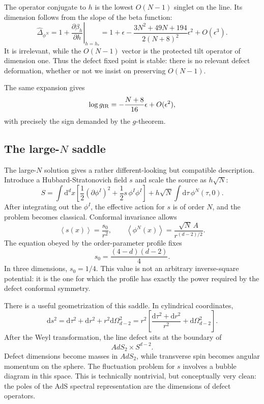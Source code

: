 \documentclass[11pt]{article}
\newcommand{\dd}{\mathrm{d}}
\newcommand{\vev}[1]{\left\langle #1\right\rangle}
\begin{document}
The operator conjugate to $h$ is the lowest $O(N-1)$ singlet on the line.  Its
dimension follows from the slope of the beta function:
\begin{equation}
  \widehat\Delta_{\phi^N}
  =1+\left.\frac{\partial\beta_h}{\partial h}\right|_{h=h_*}
  =1+\epsilon
  -\frac{3N^2+49N+194}{2(N+8)^2}\epsilon^2
  +O(\epsilon^3) .
  \label{eq:pinningSingletDimension}
\end{equation}
It is irrelevant, while the $O(N-1)$ vector is the protected tilt operator of
dimension one.  Thus the defect fixed point is stable: there is no relevant
defect deformation, whether or not we insist on preserving $O(N-1)$.

The same expansion gives
\begin{equation}
  \log g_{\rm IR}
  =-\frac{N+8}{16}\epsilon+O(\epsilon^2) ,
  \label{eq:pinninggEpsilon}
\end{equation}
with precisely the sign demanded by the $g$-theorem.

\subsection{The large-\texorpdfstring{$N$}{N} saddle}

The large-$N$ solution gives a rather different-looking but compatible
description.  Introduce a Hubbard-Stratonovich field $s$ and scale the source
as $h\sqrt N$:
\begin{equation}
  S=\int \dd^dx\left[
  \frac12(\partial\phi^I)^2+\frac12s\,\phi^I\phi^I\right]
  +h\sqrt N\int\dd\tau\,\phi^N(\tau,0) .
\end{equation}
After integrating out the $\phi^I$, the effective action for $s$ is of order
$N$, and the problem becomes classical.  Conformal invariance allows
\begin{equation}
  \vev{s(x)}=\frac{s_0}{r^2},
  \qquad
  \vev{\phi^N(x)}=\frac{\sqrt N\,A}{r^{(d-2)/2}} .
\end{equation}
The equation obeyed by the order-parameter profile fixes
\begin{equation}
  s_0=\frac{(4-d)(d-2)}{4} .
  \label{eq:pinningLargeNSaddle}
\end{equation}
In three dimensions, $s_0=1/4$.  This value is not an arbitrary
inverse-square potential: it is the one for which the profile has exactly the
power required by the defect conformal symmetry.

There is a useful geometrization of this saddle.  In cylindrical coordinates,
\begin{equation}
  \dd s^2=\dd\tau^2+\dd r^2+r^2\dd\Omega_{d-2}^2
  =r^2\left[
  \frac{\dd\tau^2+\dd r^2}{r^2}+\dd\Omega_{d-2}^2\right] .
\end{equation}
After the Weyl transformation, the line defect sits at the boundary of
\begin{equation}
  AdS_2\times S^{d-2} .
\end{equation}
Defect dimensions become masses in $AdS_2$, while transverse spin becomes
angular momentum on the sphere.  The fluctuation problem for $s$ involves a
bubble diagram in this space.  This is technically nontrivial, but conceptually
very clean: the poles of the AdS spectral representation are the dimensions of
defect operators.
\end{document}
